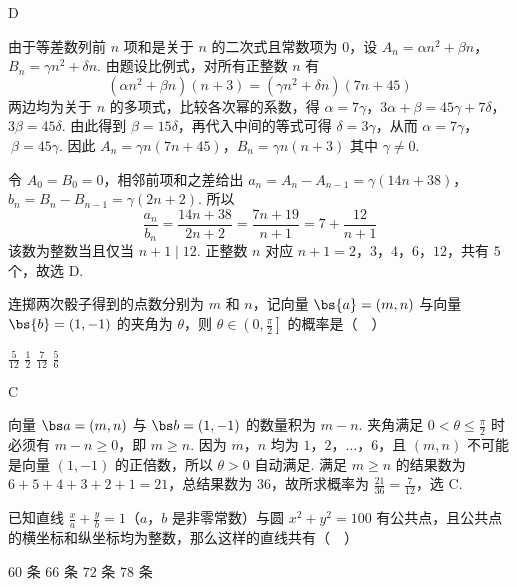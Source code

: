 \begin{answer}
D
\end{answer}

\begin{solution}
由于等差数列前 \(n\) 项和是关于 \(n\) 的二次式且常数项为 \(0\)，设
\(A_n=\alpha n^2+\beta n\)，\(B_n=\gamma n^2+\delta n\).
由题设比例式，对所有正整数 \(n\) 有
\[
(\alpha n^2+\beta n)(n+3)=(\gamma n^2+\delta n)(7n+45)
\]
两边均为关于 \(n\) 的多项式，比较各次幂的系数，得
\(\alpha=7\gamma\)，\(3\alpha+\beta=45\gamma+7\delta\)，\(3\beta=45\delta\).
由此得到 \(\beta=15\delta\)，再代入中间的等式可得 \(\delta=3\gamma\)，从而 \(\alpha=7\gamma\)，\(\ \beta=45\gamma\). 因此
\(A_n=\gamma n(7n+45)\)，\(B_n=\gamma n(n+3)\)
其中 \(\gamma\neq0\).

令 \(A_0=B_0=0\)，相邻前项和之差给出
\(a_n=A_n-A_{n-1}=\gamma(14n+38)\)，\(b_n=B_n-B_{n-1}=\gamma(2n+2)\).
所以
\[
\frac{a_n}{b_n}=\frac{14n+38}{2n+2}=\frac{7n+19}{n+1}=7+\frac{12}{n+1}
\]
该数为整数当且仅当 \(n+1\mid12\). 正整数 \(n\) 对应 \(n+1=2\)，\(3\)，\(4\)，\(6\)，\(12\)，共有 \(5\) 个，故选 D.
\end{solution}

\begin{problem}
连掷两次骰子得到的点数分别为 \(m\) 和 \(n\)，记向量 \(\bs{a} = (m, n)\) 与向量 \(\bs{b} = (1, -1)\) 的夹角为 \(\theta\)，则 \(\theta \in \left(0, \frac{\pi}{2}\right]\) 的概率是（\(\quad\)）

\choices
    {\(\frac{5}{12}\)}
    {\(\frac{1}{2}\)}
    {\(\frac{7}{12}\)}
    {\(\frac{5}{6}\)}
\end{problem}

\begin{answer}
C
\end{answer}

\begin{solution}
向量 \(\bs a=(m,n)\) 与 \(\bs b=(1,-1)\) 的数量积为 \(m-n\). 夹角满足 \(0<\theta\leqslant\frac{\pi}{2}\) 时必须有 \(m-n\geqslant0\)，即 \(m\geqslant n\). 因为 \(m\)，\(n\) 均为 \(1\)，\(2\)，\(\ldots\)，\(6\)，且 \((m,n)\) 不可能是向量 \((1,-1)\) 的正倍数，所以 \(\theta>0\) 自动满足. 满足 \(m\geqslant n\) 的结果数为 \(6+5+4+3+2+1=21\)，总结果数为 \(36\)，故所求概率为 \(\frac{21}{36}=\frac{7}{12}\)，选 C.
\end{solution}

\begin{problem}
已知直线 \(\frac{x}{a} + \frac{y}{b} = 1\)（\(a\)，\(b\) 是非零常数）与圆 \(x^2 + y^2 = 100\) 有公共点，且公共点的横坐标和纵坐标均为整数，那么这样的直线共有（\(\quad\)）

\choices
    {\(60\) 条}
    {\(66\) 条}
    {\(72\) 条}
    {\(78\) 条}
\end{problem}

